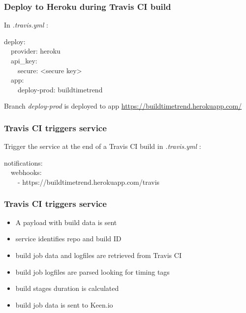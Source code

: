 \documentclass[14pt]{beamer}
\begin{document}
  \begin{frame}
    \frametitle{Deploy to Heroku during Travis CI build}
    In \textit{.travis.yml} :
    \begin{example}
      \small{deploy:\\
      \ \ provider: heroku\\
      \ \ api\_key:\\
      \ \ \ \ secure: <secure key>\\
      \ \ app:\\
      \ \ \ \ deploy-prod: buildtimetrend}
    \end{example}
    Branch \textit{deploy-prod} is deployed to app \href{https://buildtimetrend.herokuapp.com/}{https://buildtimetrend.herokuapp.com/}
  \end{frame}
  \begin{frame}
    \frametitle{Travis CI triggers service}
    Trigger the service at the end of a Travis CI build in \textit{.travis.yml} :
    \begin{example}
      \small{notifications:\\
      \ \ webhooks:\\
      \ \ \ \ - https://buildtimetrend.herokuapp.com/travis}
    \end{example}
  \end{frame}
  \begin{frame}
    \frametitle{Travis CI triggers service}
    \begin{itemize}
      \item A payload with build data is sent
      \item service identifies repo and build ID
      \item build job data and logfiles are retrieved from Travis CI
      \item build job logfiles are parsed looking for timing tags
      \item build stages duration is calculated
      \item build job data is sent to Keen.io
    \end{itemize}
  \end{frame}
\end{document}
